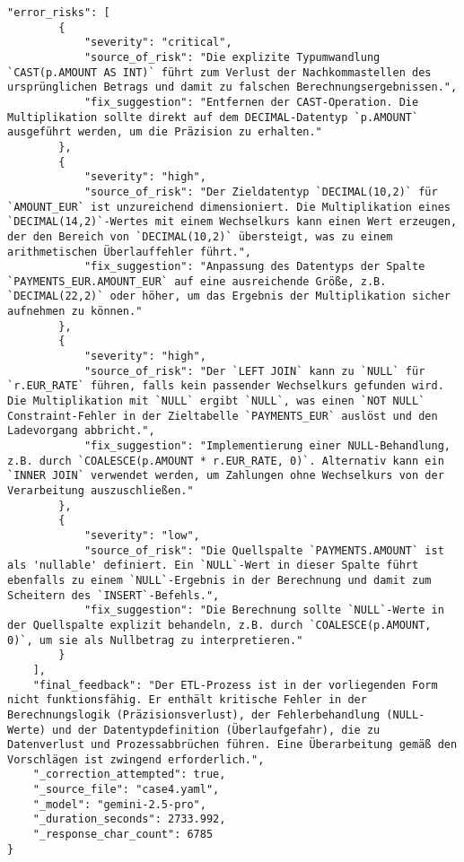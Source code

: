 \begin{lstlisting}[caption={Ausgabe: Gemini 2.5 Pro Anwendungsfall 4 Robustheitsdurchlauf},label={gemini_case4_prompt3}]
    "error_risks": [
        {
            "severity": "critical",
            "source_of_risk": "Die explizite Typumwandlung `CAST(p.AMOUNT AS INT)` führt zum Verlust der Nachkommastellen des ursprünglichen Betrags und damit zu falschen Berechnungsergebnissen.",
            "fix_suggestion": "Entfernen der CAST-Operation. Die Multiplikation sollte direkt auf dem DECIMAL-Datentyp `p.AMOUNT` ausgeführt werden, um die Präzision zu erhalten."
        },
        {
            "severity": "high",
            "source_of_risk": "Der Zieldatentyp `DECIMAL(10,2)` für `AMOUNT_EUR` ist unzureichend dimensioniert. Die Multiplikation eines `DECIMAL(14,2)`-Wertes mit einem Wechselkurs kann einen Wert erzeugen, der den Bereich von `DECIMAL(10,2)` übersteigt, was zu einem arithmetischen Überlauffehler führt.",
            "fix_suggestion": "Anpassung des Datentyps der Spalte `PAYMENTS_EUR.AMOUNT_EUR` auf eine ausreichende Größe, z.B. `DECIMAL(22,2)` oder höher, um das Ergebnis der Multiplikation sicher aufnehmen zu können."
        },
        {
            "severity": "high",
            "source_of_risk": "Der `LEFT JOIN` kann zu `NULL` für `r.EUR_RATE` führen, falls kein passender Wechselkurs gefunden wird. Die Multiplikation mit `NULL` ergibt `NULL`, was einen `NOT NULL` Constraint-Fehler in der Zieltabelle `PAYMENTS_EUR` auslöst und den Ladevorgang abbricht.",
            "fix_suggestion": "Implementierung einer NULL-Behandlung, z.B. durch `COALESCE(p.AMOUNT * r.EUR_RATE, 0)`. Alternativ kann ein `INNER JOIN` verwendet werden, um Zahlungen ohne Wechselkurs von der Verarbeitung auszuschließen."
        },
        {
            "severity": "low",
            "source_of_risk": "Die Quellspalte `PAYMENTS.AMOUNT` ist als 'nullable' definiert. Ein `NULL`-Wert in dieser Spalte führt ebenfalls zu einem `NULL`-Ergebnis in der Berechnung und damit zum Scheitern des `INSERT`-Befehls.",
            "fix_suggestion": "Die Berechnung sollte `NULL`-Werte in der Quellspalte explizit behandeln, z.B. durch `COALESCE(p.AMOUNT, 0)`, um sie als Nullbetrag zu interpretieren."
        }
    ],
    "final_feedback": "Der ETL-Prozess ist in der vorliegenden Form nicht funktionsfähig. Er enthält kritische Fehler in der Berechnungslogik (Präzisionsverlust), der Fehlerbehandlung (NULL-Werte) und der Datentypdefinition (Überlaufgefahr), die zu Datenverlust und Prozessabbrüchen führen. Eine Überarbeitung gemäß den Vorschlägen ist zwingend erforderlich.",
    "_correction_attempted": true,
    "_source_file": "case4.yaml",
    "_model": "gemini-2.5-pro",
    "_duration_seconds": 2733.992,
    "_response_char_count": 6785
}
\end{lstlisting}


